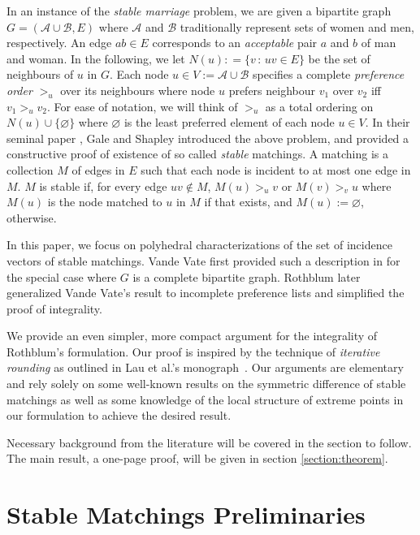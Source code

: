 \documentclass[3p,times]{elsarticle}
\newcommand{\cA}{\mathcal{A}} \newcommand{\cB}{\mathcal{B}}
\begin{document}
In an instance of the {\em stable marriage} problem, we are given a
bipartite graph $G=(\cA \cup \cB, E)$ where $\cA$ and $\cB$
traditionally represent sets of women and men, respectively. An edge
$ab \in E$ corresponds to an {\em acceptable} pair $a$ and $b$ of man
and woman. In the following, we let $N(u): = \{ v \,:\, uv \in E \}$ be
the set of neighbours of $u$ in $G$. Each node
$u \in V:=\cA \cup \cB$ specifies a complete {\em preference order}
$>_u$ over its neighbours where node $u$ prefers neighbour $v_1$
over $v_2$ iff $v_1 >_u v_2$. For ease of notation, we will think of $>_u$ as a total
ordering on $N(u) \cup \{\varnothing\}$ where 
$\varnothing$ is the least preferred element of each node $u \in V$. In their seminal paper
\cite{gale1962college}, Gale and Shapley introduced the above problem,
and provided a constructive proof of existence of so called {\em
  stable} matchings. A matching is a collection $M$ of edges in $E$
such that each node is incident to at most one edge in $M$. $M$ is
stable if, for every edge $uv \not\in M$, $M(u) >_u v$ or $M(v) >_v u$ where
$M(u)$ is the node matched to $u$ in $M$ if that exists, and
$M(u):=\varnothing$, otherwise. 

In this paper, we focus on polyhedral characterizations of the set of
incidence vectors of stable matchings.  Vande Vate first provided such
a description in \cite{vate1989linear} for the special case where $G$
is a complete bipartite graph.  Rothblum
\cite{rothblum1992characterization} later generalized Vande Vate's
result to incomplete preference lists and simplified the proof of
integrality.

We provide an even simpler, more compact argument for the integrality
of Rothblum's formulation. Our proof is inspired by the technique of
{\em iterative rounding} as outlined in Lau et al.'s
monograph~\cite{lau2011iterative}. Our arguments are elementary and
rely solely on some well-known results on the symmetric difference
of stable matchings as well as some knowledge of the local structure
of extreme points in our formulation to achieve the desired result.

Necessary background from the literature will be covered in the section to follow. The main result, a one-page proof, will be given in section \ref{section:theorem}.

\section{Stable Matchings Preliminaries}
\end{document}
